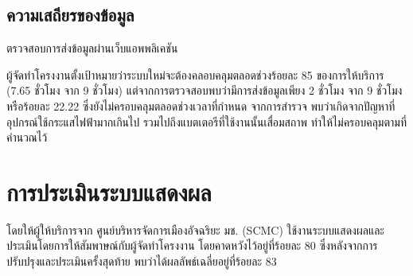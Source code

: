 \subsection{ความเสถียรของข้อมูล}

ตรวจสอบการส่งข้อมูลผ่านเว็บแอพพลิเคชัน

ผู้จัดทำโครงงานตั้งเป้าหมายว่าระบบใหม่จะต้องคลอบคลุมตลอดช่วงร้อยละ 85 ของการให้บริการ (7.65 ชั่วโมง จาก 9 ชั่วโมง) แต่จากการตรวจสอบพบว่ามีการส่งข้อมูลเพียง 2 ชั่วโมง จาก 9 ชั่วโมง หรือร้อยละ 22.22 ซึ่งยังไม่ครอบคลุมตลอดช่วงเวลาที่กำหนด จากการสำรวจ พบว่าเกิดจากปัญหาที่อุปกรณ์ใช้กระแสไฟฟ้ามากเกินไป รวมไปถึงแบตเตอรีที่ใช้งานนั้นเสื่อมสถาพ ทำให้ไม่ครอบคลุมตามที่คำนวณไว้

\section{การประเมินระบบแสดงผล}
โดยให้ผู้ให้บริการจาก ศูนย์บริหารจัดการเมืองอัจฉริยะ มช. (SCMC) ใช้งานระบบแสดงผลและประเมินโดยการให้สัมพาษณ์กับผู้จัดทำโครงงาน โดยคาดหวังไว้อยู่ที่ร้อยละ 80 ซึ่งหลังจากการปรับปรุงและประเมินครั้งสุดท้าย พบว่าได้ผลลัพธ์เฉลี่ยอยู่ที่ร้อยละ 83

